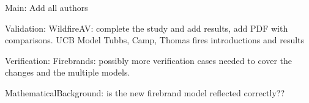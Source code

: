 Main:
    Add all authors

Validation: 
    WildfireAV: complete the study and add results, add PDF with comparisons.
    UCB Model Tubbs, Camp, Thomas fires introductions and results

Verification: 
    Firebrands: possibly more verification cases needed to cover the changes and the multiple models. 

MathematicalBackground:
    is the new firebrand model reflected correctly??